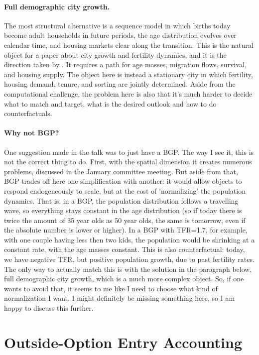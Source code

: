\documentclass[11pt]{article}
\begin{document}
\paragraph{Full demographic city growth.}
The most structural alternative is a sequence model in which births today become adult households in future periods, the age distribution evolves over calendar time, and housing markets clear along the transition. This is the natural object for a paper about city growth and fertility dynamics, and it is the direction taken by \citet{coeurdacierCombesGobillonOswaldFertility2023}. It requires a path for age masses, migration flows, survival, and housing supply. The object here is instead a stationary city in which fertility, housing demand, tenure, and sorting are jointly determined. Aside from the computational challenge, the problem here is also that it's much harder to decide what to match and target, what is the desired outlook and how to do counterfactuals.

\paragraph{Why not BGP?}
One suggestion made in the talk was to just have a BGP. The way I see it, this is not the correct thing to do. First, with the spatial dimension it creates numerous problems, discussed in the January committee meeting. But aside from that, BGP trades off here one simplification with another: it would allow objects to respond endogeneously to scale, but at the cost of 'normalizing' the population dynamics. That is, in a BGP, the population distribution follows a travelling wave, so everything stays constant in the age distribution (so if today there is twice the amount of 35 year olds as 50 year olds, the same is tomorrow, even if the absolute number is lower or higher). In a BGP with TFR=1.7, for example, with one couple having less then two kids, the population would be shrinking at a constant rate, with the age masses constant. This is also counterfactual: today, we have negative TFR, but positive population growth, due to past fertility rates. The only way to actually match this is with the solution in the paragraph below, full demographic city growth, which is a much more complex object. So, if one wants to avoid that, it seems to me like I need to choose what kind of normalization I want. I might definitely be missing something here, so I am happy to discuss this further.

\appendix
\section{Outside-Option Entry Accounting}
\end{document}
